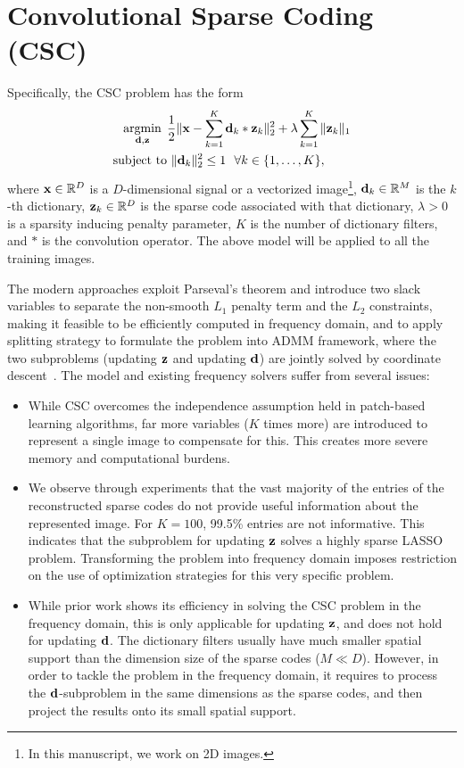 \section{Convolutional Sparse Coding (CSC)}
Specifically, the CSC problem has the form
\begin{equation}
\begin{split}
    \minimize{\filter,\code} & \frac{1}{2}\|\signal - \sum_{k=1}^{K} \filter_k * \code_k \|_2^2 + \lambda \sum_{k=1}^{K}\| \code_k \|_1 \\
    \text{subject to} & ~ \|\filter_k\|^2_2 \leq 1 ~~ \forall k \in \{1,\dots,K\},
\end{split}
\end{equation}
where $\signal \in \mathbb{R}^D$ is a $D$-dimensional signal or a vectorized image\footnote{In this manuscript, we work on 2D images.}, $\filter_k \in \mathbb{R}^M$ is the $k$-th dictionary, $\code_k\in \mathbb{R}^D$ is the sparse code associated with that dictionary,  $\lambda>0$ is a sparsity inducing penalty parameter, $K$ is the number of dictionary filters, and $*$ is the convolution operator. The above model will be applied to all the training images.

The modern approaches exploit Parseval's theorem and introduce two slack variables to separate the non-smooth $L_1$ penalty term and the $L_2$ constraints, making it feasible to be efficiently computed in frequency domain, and to apply splitting strategy to formulate the problem into ADMM framework, where the two subproblems (updating $\code$ and updating $\filter$) are jointly solved by coordinate descent~\cite{bristow2013fast,heide2015fast,wohlberg2016efficient}. The model and existing frequency solvers suffer from several issues:

\begin{itemize}
  \item While CSC overcomes the independence assumption held in patch-based learning algorithms, far more variables ($K$ times more) are introduced to represent a single image to compensate for this. This creates more severe memory and computational burdens.
  
  \item We observe through experiments that the vast majority of the entries of the reconstructed sparse codes do not provide useful information about the represented image. For $K=100$, 99.5\% entries are not informative. This indicates that the subproblem for updating $\code$ solves a highly sparse LASSO problem. Transforming the problem into frequency domain imposes restriction on the use of optimization strategies for this very specific problem.
 
  \item While prior work shows its efficiency in solving the CSC problem in the frequency domain, this is only applicable for updating $\code$, and does not hold for updating $\filter$. The dictionary filters usually have much smaller spatial support than the dimension size of the sparse codes ($M \ll D$). However, in order to tackle the problem in the frequency domain, it requires to process the $\filter$-subproblem in the same dimensions as the sparse codes, and then project the results onto its small spatial support.
\end{itemize}